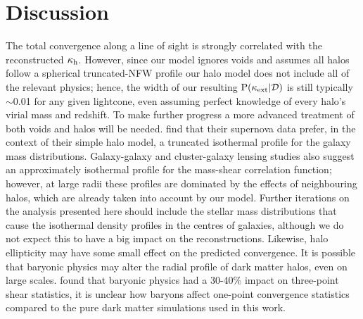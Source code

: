 \documentclass[useAMS,usenatbib,a4paper]{mn2e}
\begin{document}
\section{Discussion}
\label{sec:discuss}


The total convergence along a line of sight is strongly correlated with the
reconstructed $\kappa_{\rm h}$. However, since our model ignores voids and assumes
all halos follow a spherical truncated-NFW profile our halo model does not
include all of the relevant physics; hence, the width of our resulting
${\rm P}(\kappa_{\rm ext}|{\mathcal{D}})$ is still typically $\sim$0.01 for any given lightcone,
even assuming perfect knowledge of every halo's virial mass and redshift. To
make further progress a more advanced treatment of both voids and halos will
be needed. \citet{KarpenkaEtal2012} find that their supernova data prefer, in
the context of their simple halo model, a truncated isothermal profile for the
galaxy mass distributions. Galaxy-galaxy and cluster-galaxy  lensing studies
\citep[\eg][]{GavazziEtal2007,JohnstonEtal2007, LagattutaEtal2010} also suggest an approximately
isothermal profile for the mass-shear correlation function; however, at large
radii these profiles are dominated by the effects of neighbouring halos, which
are already taken into account by our model.  Further iterations on the
analysis presented here should include the stellar mass distributions that
cause the isothermal density profiles in the centres of galaxies, although we
do not expect this to have a big impact on the reconstructions. Likewise, 
halo ellipticity
may have some small effect on the predicted convergence. It
is possible that baryonic physics may alter the radial profile of dark
matter halos, even on large scales. \citet{Semboloni+2012} found that baryonic
physics had a 30-40\% impact on three-point shear statistics, it is unclear
how baryons affect one-point convergence statistics compared to the pure dark
matter simulations used in this work.
\end{document}
